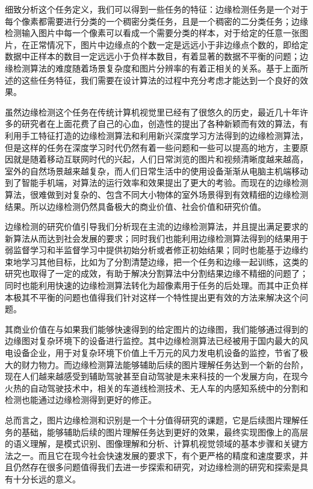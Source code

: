 \documentclass[master]{thesis-uestc}
\begin{document}
细致分析这个任务定义，我们可以得到一些任务的特征：边缘检测任务是一个对于每个像素都需要进行分类的一个稠密分类任务，且是一个稠密的二分类任务；边缘检测输入图片中每一个像素可以看成一个需要分类的样本，对于给定的任意一张图片，在正常情况下，图片中边缘点的个数一定是远远小于非边缘点个数的，即给定数据中正样本的数目一定远远小于负样本数目，有着显著的数据不平衡的问题；边缘检测算法的难度随着场景复杂度和图片分辨率的有着正相关的关系。基于上面所述的这些任务特征，我们需要在设计算法的过程中充分考虑才能达到一个良好的效果。

虽然边缘检测这个任务在传统计算机视觉里已经有了很悠久的历史，最近几十年许多的研究者在上面花费了自己的心血，创造性的提出了各种新颖而有效的算法，有利用手工特征打造的边缘检测算法和利用新兴深度学习方法得到的边缘检测算法，但是这样的任务在深度学习时代仍然有着一些问题和一些可以提高的地方，主要原因就是随着移动互联网时代的兴起，人们日常浏览的图片和视频清晰度越来越高，室外的自然场景越来越复杂，而人们日常生活中的使用设备渐渐从电脑主机端移动到了智能手机端，对算法的运行效率和效果提出了更大的考验。而现在的边缘检测算法，很难做到对复杂的、包含不同大小物体的室外场景得到有效精细的边缘检测结果。所以边缘检测仍然具备极大的商业价值、社会价值和研究价值。

边缘检测的研究价值引导我们分析现在主流的边缘检测算法，并且提出满足要求的新算法从而达到社会发展的要求；同时我们也能利用边缘检测算法得到的结果用于弱监督学习和半监督学习中提供初始分析或者修正初始结果；同时也能基于边缘约束地学习其他目标，比如为了分割清楚边缘，把一个任务和边缘一起训练，这类的研究也取得了一定的成效，有助于解决分割算法中分割结果边缘不精细的问题了；同时也能利用快速的边缘检测算法转化为超像素用于任务的后处理。而其中正负样本极其不平衡的问题也值得我们针对这样一个特性提出更有效的方法来解决这个问题。

其商业价值在与如果我们能够快速得到的给定图片的边缘图，我们能够通过得到的边缘图对复杂环境下的设备进行监控。其中边缘检测算法已经被用于国内最大的风电设备企业，用于对复杂环境下价值上千万元的风力发电机设备的监控，节省了极大的财力物力。而边缘检测算法能够辅助后续的图片理解任务达到一个新的台阶，现在人们越来越感受到辅助驾驶甚至自动驾驶是未来科技的一个发展方向，在现今火热的自动驾驶技术中，相关的车道线检测技术、无人车的内感知系统中的分割和检测也能通过边缘检测得到更好的修正。

总而言之，图片边缘检测和识别是一个十分值得研究的课题，它是后续图片理解任务的基础，能够辅助后续的图片理解任务达到更好的效果，最终实现图像上的高层的语义理解，是模式识别、图像理解和分析、计算机视觉领域的基本步骤和关键方法之一。而且它在现今社会快速发展的要求下，有个更严格的精度和速度要求，并且仍然存在很多问题值得我们去进一步探索和研究，对边缘检测的研究和探索是具有十分长远的意义。
\end{document}
